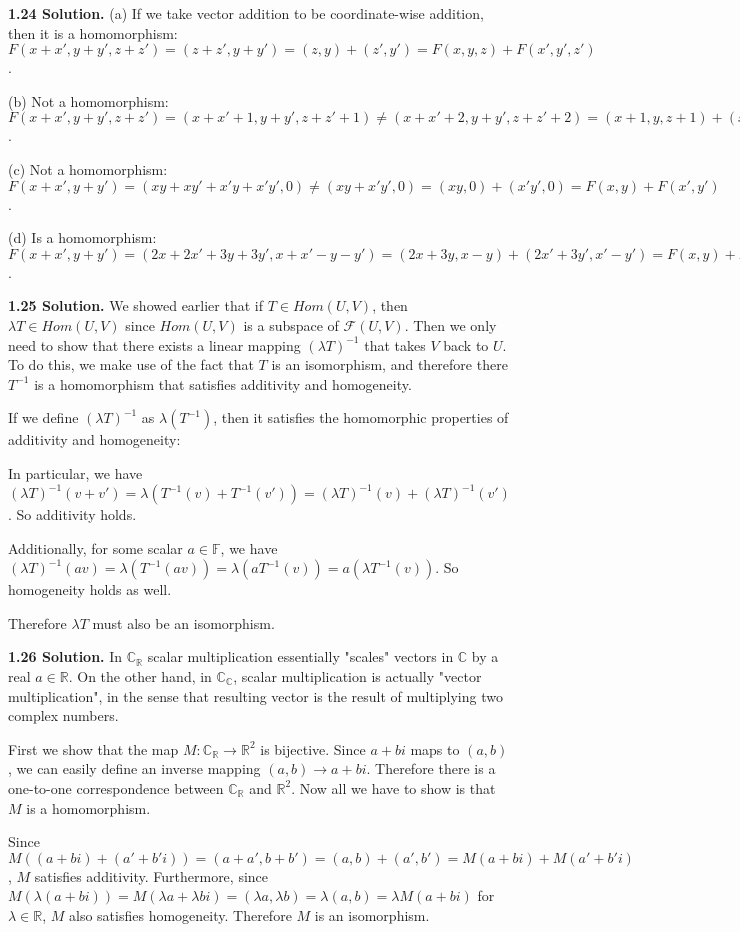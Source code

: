 \textbf{1.24 Solution.} (a) If we take vector addition to be coordinate-wise addition, then it is a homomorphism: $F(x+x',y+y',z+z')=(z+z',y+y')=(z,y)+(z',y')=F(x,y,z)+F(x',y',z')$.

(b) Not a homomorphism: $F(x+x',y+y',z+z')=(x+x'+1,y+y',z+z'+1)\neq(x+x'+2,y+y',z+z'+2)=(x+1,y,z+1)+(x'+1,y',z'+1)=F(x,y,z)+F(x',y',z')$.

(c) Not a homomorphism:
$F(x+x',y+y')=(xy+xy'+x'y+x'y',0)\neq(xy+x'y',0)=(xy,0)+(x'y',0)=F(x,y)+F(x',y')$.

(d) Is a homomorphism:
$F(x+x',y+y')=(2x+2x'+3y+3y',x+x'-y-y')=(2x+3y,x-y)+(2x'+3y',x'-y')=F(x,y)+F(x',y')$.

\textbf{1.25 Solution.} We showed earlier that if $T\in Hom(U,V)$, then $\lambda T\in Hom(U,V)$ since $Hom(U,V)$ is a subspace of $\mathcal{F}(U,V)$. Then we only need to show that there exists a linear mapping $(\lambda T)^{-1}$ that takes $V$ back to $U$. To do this, we make use of the fact that $T$ is an isomorphism, and therefore there $T^{-1}$ is a homomorphism that satisfies additivity and homogeneity.

If we define $(\lambda T)^{-1}$ as $\lambda(T^{-1})$, then it satisfies the homomorphic properties of additivity and homogeneity:

In particular, we have $(\lambda T)^{-1}(v+v')=\lambda(T^{-1}(v)+T^{-1}(v'))=(\lambda T)^{-1}(v)+(\lambda T)^{-1}(v')$. So additivity holds.

Additionally, for some scalar $a\in\mathbb{F}$, we have $(\lambda T)^{-1}(av)=\lambda(T^{-1}(av))=\lambda(aT^{-1}(v))=a(\lambda T^{-1}(v))$. So homogeneity holds as well.

Therefore $\lambda T$ must also be an isomorphism.

\textbf{1.26 Solution.} In $\mathbb{C}_\mathbb{R}$ scalar multiplication essentially "scales" vectors in $\mathbb{C}$ by a real $a\in\mathbb{R}$. On the other hand, in $\mathbb{C}_\mathbb{C}$, scalar multiplication is actually "vector multiplication", in the sense that resulting vector is the result of multiplying two complex numbers.

First we show that the map $M:\mathbb{C}_\mathbb{R}\to \mathbb{R}^2$ is bijective. Since $a+bi$ maps to $(a,b)$, we can easily define an inverse mapping $(a,b)\to a+bi$. Therefore there is a one-to-one correspondence between $\mathbb{C}_\mathbb{R}$ and $\mathbb{R}^2$. Now all we have to show is that $M$ is a homomorphism. 

Since $M((a+bi)+(a'+b'i))=(a+a',b+b')=(a,b)+(a',b')=M(a+bi)+M(a'+b'i)$, $M$ satisfies additivity. Furthermore, since $M(\lambda(a+bi))=M(\lambda a+\lambda bi)=(\lambda a, \lambda b) = \lambda (a, b)=\lambda M(a+bi)$ for $\lambda\in\mathbb{R}$, $M$ also satisfies homogeneity. Therefore $M$ is an isomorphism.

